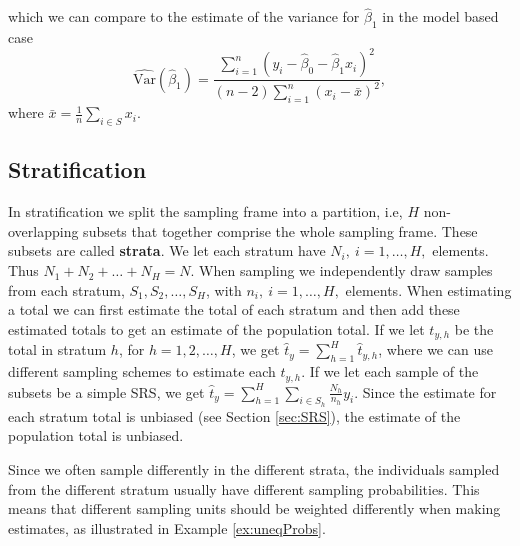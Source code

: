 \documentclass{article}
\begin{document}
which we can compare to the estimate of the variance for \(\hat{\beta}_1\) in
the model based case
\begin{equation*}
 \widehat{\mathrm{Var}} \left( \hat{\beta}_1 \right) = \frac{\sum_{i = 1}^n\left( y_i - \hat{\beta}_0 -
 \hat{\beta}_1 x_i \right)^2}{
   \left( n - 2 \right)\sum_{i = 1}^n \left( x_i - \bar{x} \right)^2},
\end{equation*}
where \(\bar{x} = \frac{1}{n} \sum_{i \in S} x_i\).


\subsection{Stratification} \label{sec:strat}

In stratification we split the sampling frame into a partition, i.e, \(H\) non-
overlapping subsets that together comprise the whole sampling frame. These
subsets are called \textbf{strata}. We let each stratum have \(N_i,\ i = 1, \dots
, H,\) elements. Thus \(N_1 + N_2 + \dots + N_H = N\). When sampling we
independently draw samples from each stratum, \(S_1, S_2, \dots, S_H\), with \(n_i,\ i = 1, \dots
, H,\) elements. When
estimating a total we can first estimate the total of each stratum and
then add these estimated totals to get an estimate of the population total.
If we let \(t_{y,h}\) be the total in stratum \(h\), for \(h = 1, 2, \dots, H\), we get \(\hat{t}_y =
\sum_{h = 1}^H \hat{t}_{y, h} \), where we can use different sampling schemes to
estimate each \(t_{y, h}\).
If we let each sample of the subsets be a simple SRS, we get \( \hat{t}_y =
\sum_{h = 1}^H\sum_{i \in S_h}\frac{N_h}{n_h}y_i\).
Since the estimate for each
stratum total is unbiased (see Section \ref{sec:SRS}), the estimate of the population
total is unbiased.

Since we often sample differently in the different strata,
the individuals sampled from the different stratum usually have
different sampling probabilities. This means that different sampling units
should be weighted differently when making estimates, as illustrated in Example \ref{ex:uneqProbs}.
\end{document}
